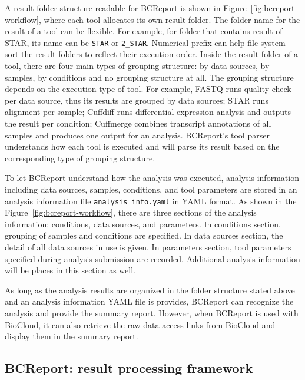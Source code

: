 A result folder structure readable for BCReport is shown in
Figure~\ref{fig:bcreport-workflow}, where each tool allocates its own result
folder. The folder name for the result of a tool can be flexible. For example,
for folder that contains result of STAR, its name can be \texttt{STAR} or
\texttt{2\_STAR}. Numerical prefix can help file system sort the result folders
to reflect their execution order. Inside the result folder of a tool, there are
four main types of grouping structure: by data sources, by samples, by
conditions and no grouping structure at all. The grouping structure depends on
the execution type of tool. For example, FASTQ runs quality check per data
source, thus its results are grouped by data sources; STAR runs alignment per
sample; Cuffdiff runs differential expression analysis and outputs the result
per condition; Cuffmerge combines transcript annotations of all samples and
produces one output for an analysis. BCReport's tool parser understands how
each tool is executed and will parse its result based on the corresponding type
of grouping structure.


To let BCReport understand how the analysis was executed, analysis information
including data sources, samples, conditions, and tool parameters are stored in
an analysis information file \texttt{analysis\_info.yaml} in YAML \cite{:yaml}
format. As shown in the Figure~\ref{fig:bcreport-workflow}, there are three
sections of the analysis information: conditions, data sources, and parameters.
In conditions section, grouping of samples and conditions are specified. In
data sources section, the detail of all data sources in use is given. In
parameters section, tool parameters specified during analysis submission are
recorded. Additional analysis information will be places in this section as
well.

As long as the analysis results are organized in the folder structure stated
above and an analysis information YAML file is provides, BCReport can recognize
the analysis and provide the summary report. However, when BCReport is used
with BioCloud, it can also retrieve the raw data access links from BioCloud and
display them in the summary report.


\subsection{BCReport: result processing framework}

